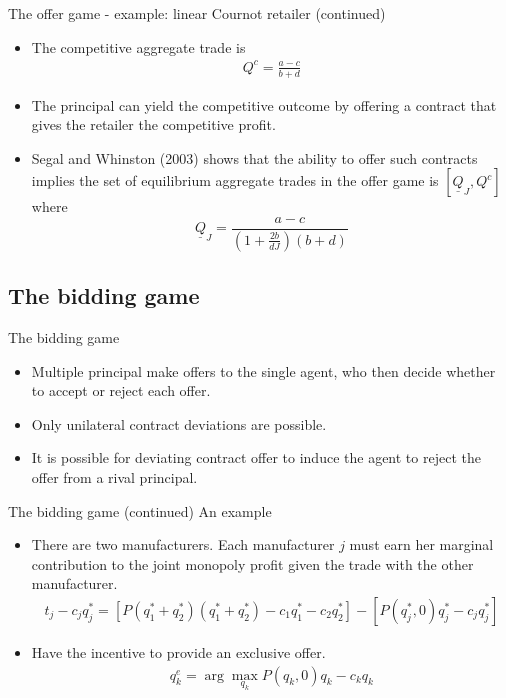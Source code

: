 \documentclass[aspectratio=169]{beamer}  %
\begin{document}
\begin{frame}{The offer game - example: linear Cournot retailer (continued)}
    \begin{itemize}
        \item The competitive aggregate trade is
        \begin{align}
            Q^c = \frac{a-c}{b+d}
        \end{align}
        \item The principal can yield the competitive outcome by offering a contract that gives the retailer the competitive profit. \vspace{.2cm}
        \item Segal and Whinston (2003) shows that the ability to offer such contracts implies the set of equilibrium aggregate trades in the offer game is $[\underline{Q}_J,Q^c]$ where 
        $$\underline{Q}_J = \frac{a-c}{(1+\frac{2b}{dJ})(b+d)}$$ 
    \end{itemize}

\end{frame}


\subsection{The bidding game}
\begin{frame}{The bidding game}
    \begin{itemize}
        \item Multiple principal make offers to the single agent, who then decide whether to accept or reject each offer. \vspace{.2cm}
        \item Only unilateral contract deviations are possible. \vspace{.2cm}
        \item It is possible for deviating contract offer to induce the agent to reject the offer from a rival principal. \vspace{.2cm}
    \end{itemize}
\end{frame}



\begin{frame}{The bidding game (continued)}
    An example \vspace{.2cm}
    \begin{itemize}
        \item There are two manufacturers. Each manufacturer $j$ must earn her marginal contribution to the joint monopoly profit given the trade with the other manufacturer.
        \begin{align}
            t_j - c_j q_j^* = [ P(q_1^* + q_2^*)(q_1^* + q_2^*) - c_1 q_1^* - c_2 q_2^*] - [ P(q_j^*, 0)q_j^* - c_j q_j^*]
        \end{align}
        \item Have the incentive to provide an exclusive offer.
        \begin{align}
            q_k^e = \arg \max_{q_k} P(q_k, 0) q_k - c_k q_k
        \end{align}
    \end{itemize}
\end{frame}
\end{document}
